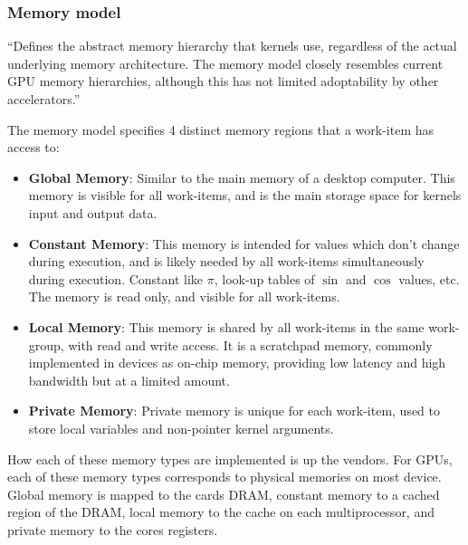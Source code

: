 \subsubsection{Memory model}


``Defines the abstract memory hierarchy that kernels use, regardless of the
actual underlying memory architecture. The memory model closely resembles
current GPU memory hierarchies, although this has not limited adoptability by
other accelerators.''

The memory model specifies 4 distinct memory regions that a work-item has
access to:

\begin{itemize}

\item \textbf{Global Memory}: Similar to the main memory of a desktop
computer. This memory is visible for all work-items, and is the main storage
space for kernels input and output data.

\item \textbf{Constant Memory}: This memory is intended for values   which
don't change during execution, and is likely needed by all   work-items
simultaneously during execution. Constant like $\pi$,   look-up tables of
$\sin$ and $\cos$ values, etc. The memory is   read only, and visible for all
work-items.

\item \textbf{Local Memory}: This memory is shared by all work-items   in the
same work-group, with read and write access. It is a   scratchpad memory,
commonly implemented in devices as on-chip memory,   providing low latency and
high bandwidth but at a limited amount.

\item \textbf{Private Memory}: Private memory is unique for each   work-item,
used to store local variables and non-pointer kernel   arguments.

\end{itemize}

How each of these memory types are implemented is up the vendors. For GPUs,
each of these memory types corresponds to physical memories on most device.
Global memory is mapped to the cards DRAM, constant memory to a cached region
of the DRAM, local memory to the cache on each multiprocessor, and private
memory to the cores registers.

